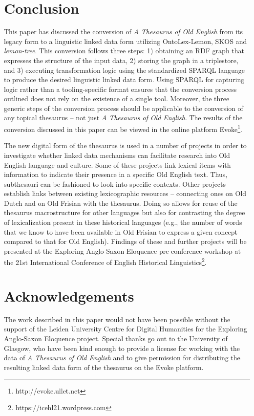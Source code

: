 \section{Conclusion}
This paper has discussed the conversion of \textit{A Thesaurus of Old English} from its legacy form to a linguistic linked data form utilizing OntoLex-Lemon, SKOS and \textit{lemon-tree}. This conversion follows three steps: 1) obtaining an RDF graph that expresses the structure of the input data, 2) storing the graph in a triplestore, and 3) executing transformation logic using the standardized SPARQL language to produce the desired linguistic linked data form. Using SPARQL for capturing logic rather than a tooling-specific format ensures that the conversion process outlined does not rely on the existence of a single tool. Moreover, the three generic steps of the conversion process should be applicable to the conversion of any topical thesaurus – not just \textit{A Thesaurus of Old English}. The results of the conversion discussed in this paper can be viewed in the online platform Evoke\footnote{http://evoke.ullet.net}.

The new digital form of the thesaurus is used in a number of projects in order to investigate whether linked data mechanisms can facilitate research into Old English language and culture. Some of these projects link lexical items with information to indicate their presence in a specific Old English text. Thus, subthesauri can be fashioned to look into specific contexts. Other projects establish links between existing lexicographic resources – connecting ones on Old Dutch and on Old Frisian with the thesaurus. Doing so allows for reuse of the thesaurus macrostructure for other languages but also for contrasting the degree of lexicalization present in these historical languages (e.g., the number of words that we know to have been available in Old Frisian to express a given concept compared to that for Old English). Findings of these and further projects will be presented at the Exploring Anglo-Saxon Eloquence pre-conference workshop at the 21st International Conference of English Historical Linguistics\footnote{https://icehl21.wordpress.com}.

\section{Acknowledgements}
The work described in this paper would not have been possible without the support of the Leiden University Centre for Digital Humanities for the Exploring Anglo-Saxon Eloquence project. Special thanks go out to the University of Glasgow, who have been kind enough to provide a license for working with the data of \textit{A Thesaurus of Old English} and to give permission for distributing the resulting linked data form of the thesaurus on the Evoke platform.

